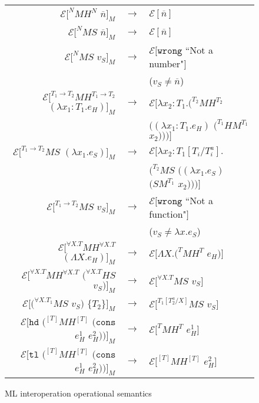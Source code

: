 \begin{figure}[p]
\label{mios}
\caption{ML interoperation operational semantics}
\begin{center}
\begin{tabular}{rcl}
$\mathscr{E}[^{N}MH^{N}$ $\overline{n}]_{M}$ & $\rightarrow$ & $\mathscr{E}[\overline{n}]$ \\
$\mathscr{E}[^{N}MS$ $\overline{n}]_{M}$ & $\rightarrow$ & $\mathscr{E}[\overline{n}]$ \\
$\mathscr{E}[^{N}MS$ $v_{S}]_{M}$ & $\rightarrow$ & $\mathscr{E}[\mathtt{wrong}$ ``Not a number"$]$ \\
&& ($v_{S}\neq\overline{n}$) \\
$\mathscr{E}[^{T_{1}\rightarrow T_{2}}MH^{T_{1}\rightarrow T_{2}}$ $(\lambda x_{1}:T_{1}.e_{H})]_{M}$ & $\rightarrow$ & $\mathscr{E}[\lambda x_{2}:T_{1}.(^{T_{2}}MH^{T_{2}}$ \\
&& $((\lambda x_{1}:T_{1}.e_{H})$ $(^{T_{1}}HM^{T_{1}}$ $x_{2})))]$ \\
$\mathscr{E}[^{T_{1}\rightarrow T_{2}}MS$ $(\lambda x_{1}.e_{S})]_{M}$ & $\rightarrow$ & $\mathscr{E}[\lambda x_{2}:T_{1}[T_{i}/T^{a}_{i}].$ \\
&& $(^{T_{2}}MS$ $((\lambda x_{1}.e_{S})$ $(SM^{T_{1}}$ $x_{2})))]$ \\
$\mathscr{E}[^{T_{1}\rightarrow T_{2}}MS$ $v_{S}]_{M}$ & $\rightarrow$ & $\mathscr{E}[\mathtt{wrong}$ ``Not a function"$]$ \\
&& ($v_{S}\neq\lambda x.e_{S}$) \\
$\mathscr{E}[^{\forall X.T}MH^{\forall X.T}$ $(\Lambda X.e_{H})]_{M}$ & $\rightarrow$ & $\mathscr{E}[\Lambda X.(^{T}MH^{T}$ $e_{H})]$ \\
$\mathscr{E}[^{\forall X.T}MH^{\forall X.T}$ $(^{\forall X.T}HS$ $v_{S})]_{M}$ & $\rightarrow$ & $\mathscr{E}[^{\forall X.T}MS$ $v_{S}]$ \\
$\mathscr{E}[(^{\forall X.T_{1}}MS$ $v_{S})$ $\lbrace T_{2}\rbrace]_{M}$ & $\rightarrow$ & $\mathscr{E}[^{T_{1}[T^{a}_{2}/X]}MS$ $v_{S}]$ \\
$\mathscr{E}[\mathtt{hd}$ $(^{[T]}MH^{[T]}$ $(\mathtt{cons}$ $e_{H}^{1}$ $e_{H}^{2}))]_{M}$ & $\rightarrow$ & $\mathscr{E}[^{T}MH^{T}$ $e_{H}^{1}]$ \\
$\mathscr{E}[\mathtt{tl}$ $(^{[T]}MH^{[T]}$ $(\mathtt{cons}$ $e_{H}^{1}$ $e_{H}^{2}))]_{M}$ & $\rightarrow$ & $\mathscr{E}[^{[T]}MH^{[T]}$ $e_{H}^{2}]$ \\

\end{tabular}
\end{center}
\end{figure}

